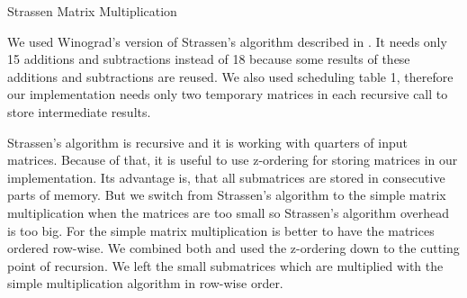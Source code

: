 \documentclass{article}
\begin{document}
\begin{algorithm}[H] 
\caption{Strassen Matrix Multiplication}
\label{alg:strassen}
\begin{algorithmic}[1]
\Statex
{}
		\State \Return {}
	\EndIf
	 	
	\State {}
\EndFunction
\end{algorithmic}
\end{algorithm}

We used Winograd's version of Strassen's algorithm described in \cite{boyer2009memory}.
It needs only 15 additions and subtractions instead of 18 because some results of 
these additions and subtractions are reused. We also used scheduling table 1, 
therefore our implementation needs only two temporary matrices in each recursive call
to store intermediate results.

Strassen's algorithm is recursive and it is working with quarters of input matrices.
Because of that, it is useful to use z-ordering for storing matrices in our implementation.
Its advantage is, that all submatrices are stored in consecutive parts of memory.
But we switch from Strassen's algorithm to the simple matrix multiplication
when the matrices are too small so Strassen's algorithm overhead is too big.
For the simple matrix multiplication is better to have the matrices ordered row-wise.
We combined both and used the z-ordering down to the cutting point of recursion.
We left the small submatrices which are multiplied with the simple multiplication algorithm
in row-wise order. %
\end{document}
